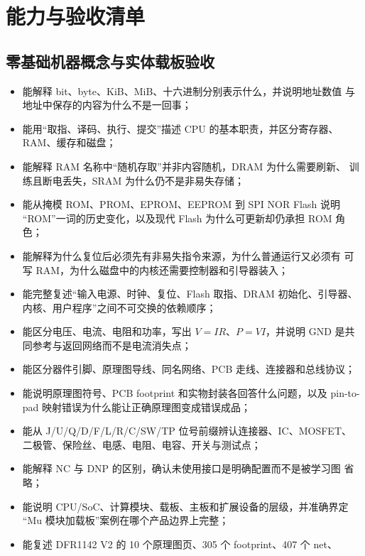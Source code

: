 \chapter*{能力与验收清单}

\section*{零基础机器概念与实体载板验收}

\begin{itemize}
  \item 能解释 bit、byte、KiB、MiB、十六进制分别表示什么，并说明地址数值
        与地址中保存的内容为什么不是一回事；
  \item 能用“取指、译码、执行、提交”描述 CPU 的基本职责，并区分寄存器、
        RAM、缓存和磁盘；
  \item 能解释 RAM 名称中“随机存取”并非内容随机，DRAM 为什么需要刷新、
        训练且断电丢失，SRAM 为什么仍不是非易失存储；
  \item 能从掩模 ROM、PROM、EPROM、EEPROM 到 SPI NOR Flash 说明
        “ROM”一词的历史变化，以及现代 Flash 为什么可更新却仍承担 ROM 角色；
  \item 能解释为什么复位后必须先有非易失指令来源，为什么普通运行又必须有
        可写 RAM，为什么磁盘中的内核还需要控制器和引导器装入；
  \item 能完整复述“输入电源、时钟、复位、Flash 取指、DRAM 初始化、引导器、
        内核、用户程序”之间不可交换的依赖顺序；
  \item 能区分电压、电流、电阻和功率，写出 \(V=IR\)、\(P=VI\)，并说明
        GND 是共同参考与返回网络而不是电流消失点；
  \item 能区分器件引脚、原理图导线、同名网络、PCB 走线、连接器和总线协议；
  \item 能说明原理图符号、PCB footprint 和实物封装各回答什么问题，以及
        pin-to-pad 映射错误为什么能让正确原理图变成错误成品；
  \item 能从 J/U/Q/D/F/L/R/C/SW/TP 位号前缀辨认连接器、IC、MOSFET、
        二极管、保险丝、电感、电阻、电容、开关与测试点；
  \item 能解释 NC 与 DNP 的区别，确认未使用接口是明确配置而不是被学习图
        省略；
  \item 能说明 CPU/SoC、计算模块、载板、主板和扩展设备的层级，并准确界定
        “Mu 模块加载板”案例在哪个产品边界上完整；
  \item 能复述 DFR1142 V2 的 10 个原理图页、305 个 footprint、407 个 net、

\end{itemize}
